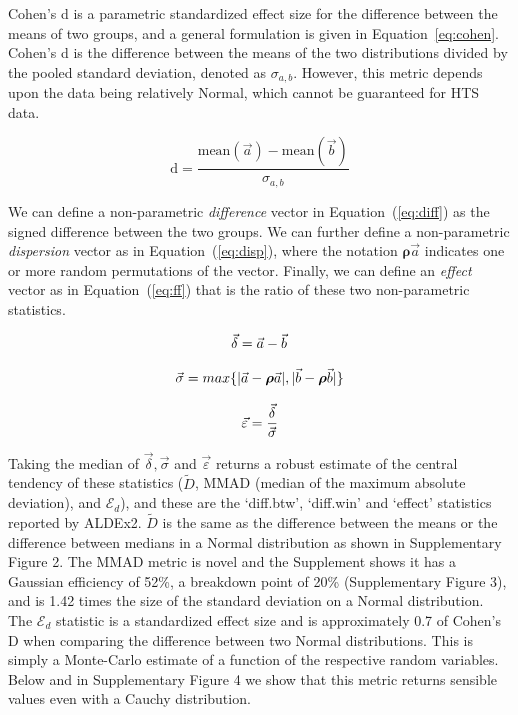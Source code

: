 \documentclass{bioinfo}
\begin{document}
Cohen's d is a parametric standardized effect size for the difference between the means of two groups, and a general formulation is given in Equation~\ref{eq:cohen}. Cohen's d is the difference between the means of the two distributions divided by the pooled standard deviation, denoted as \(\sigma_{a,b}\). However, this metric depends upon the data being relatively Normal, which cannot be guaranteed for HTS data. 

\begin{equation}
\mathrm{d} = \frac{\mathrm{mean}(\vec{a} )- \mathrm{mean}(\vec{b})}{\sigma_{a,b}}
\label{eq:cohen}
\end{equation}

We can define a non-parametric  \emph{difference} vector  in Equation~(\ref{eq:diff}) as the signed difference between the two groups. We can further define a non-parametric  \emph{dispersion} vector as in Equation~(\ref{eq:disp}), where the notation $\boldsymbol{\rho}\vec{a}$ indicates one or more random permutations of the vector. Finally, we can define an \emph{effect} vector as in Equation~(\ref{eq:ff}) that is the ratio of these two non-parametric statistics. 

\begin{equation}
\vec{\delta} = \vec{a} - \vec{b}
\label{eq:diff}\vspace*{-10pt}
\end{equation}

\begin{equation}
\vec{\sigma} = max \{ \lvert \vec{a} - \boldsymbol{\rho} \vec{a}  \rvert ,\lvert \vec{b} -\boldsymbol{\rho} \vec{b} \rvert \}
\label{eq:disp}\vspace*{-10pt}
\end{equation}

\begin{equation}
\vec{\varepsilon} = \frac{\vec{\delta}}{\vec{\sigma}}
\label{eq:ff}\vspace*{0pt}
\end{equation}

Taking the median of $\vec{\delta}, \vec{\sigma}$ and $\vec{\varepsilon}$ returns a robust estimate of the central tendency of these statistics ($\tilde{D}$, MMAD (median of the maximum absolute deviation), and $\mathcal{E}_{d}$), and these are the `diff.btw', `diff.win' and `effect' statistics reported by ALDEx2. $\tilde{D}$ is the same as the difference between the means or the difference between medians in a Normal distribution as shown in Supplementary Figure  2. The MMAD metric is novel and the Supplement shows it has a Gaussian efficiency of 52\%, a breakdown point of 20\% (Supplementary Figure 3), and is 1.42 times the size of the standard deviation on a Normal distribution. The $\mathcal{E}_{d}$ statistic is a standardized effect size and is approximately 0.7 of Cohen's D when comparing the difference between two Normal distributions.  This is simply a Monte-Carlo estimate of a function of the respective random variables. Below and in Supplementary Figure 4 we show that this metric returns sensible values even with a Cauchy distribution.
\end{document}
